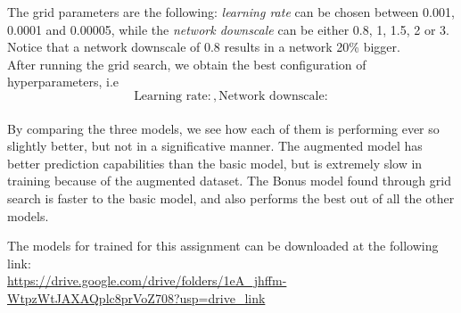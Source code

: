 \documentclass[tikz,14pt,fleqn]{article}
\begin{document}
The grid parameters are the following: \textit{learning rate} can be chosen between 0.001, 0.0001 and 0.00005, while the \textit{network downscale} can be either 0.8, 1, 1.5, 2 or 3. Notice that a network downscale of 0.8 results in a network 20\% bigger.\\
After running the grid search, we obtain the best configuration of hyperparameters, i.e $$\text{Learning rate}: , \text{Network downscale}: $$\\
By comparing the three models, we see how each of them is performing ever so slightly better, but not in a significative manner. The augmented model has better prediction capabilities than the basic model, but is extremely slow in training because of the augmented dataset. The Bonus model found through grid search is faster to the basic model, and also performs the best out of all the other models.

The models for trained for this assignment can be downloaded at the following link:\\
\href{https://drive.google.com/drive/folders/1eA\_jhffm-WtpzWtJAXAQplc8prVoZ708?usp=drive\_link}{https://drive.google.com/drive/folders/1eA\_jhffm-WtpzWtJAXAQplc8prVoZ708?usp=drive\_link}
\end{document}
